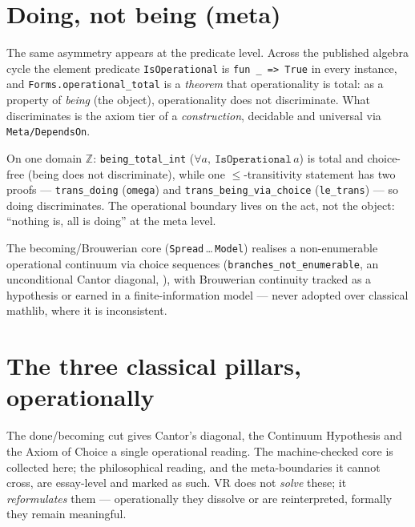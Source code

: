 \section{Doing, not being (meta)}
\label{sec:continuum_doing}

The same asymmetry appears at the predicate level.  Across the published algebra cycle
the element predicate \texttt{IsOperational} is \texttt{fun \_ => True} in every
instance, and \texttt{Forms.operational\_total} is a \emph{theorem} that operationality
is total: as a property of \emph{being} (the object), operationality does not
discriminate.  What discriminates is the axiom tier of a \emph{construction}, decidable
and universal via \texttt{Meta/DependsOn}.

\begin{theorem}
\label{thm:continuum_doingbeing}
\leanok
On one domain $\mathbb{Z}$: \texttt{being\_total\_int} ($\forall a,\ \texttt{IsOperational}\,a$)
is total and choice-free (being does not discriminate), while one $\le$-transitivity
statement has two proofs --- \texttt{trans\_doing} (\texttt{omega})
 and \texttt{trans\_being\_via\_choice}
(\texttt{le\_trans})  --- so doing
discriminates.  The operational boundary lives on the act, not the object: ``nothing
is, all is doing'' at the meta level.
\end{theorem}

The becoming/Brouwerian core (\texttt{Spread}\,\dots\,\texttt{Model}) realises a
non-enumerable operational continuum via choice sequences
(\texttt{branches\_not\_enumerable}, an unconditional Cantor diagonal,
\axiomprofile{[]}), with Brouwerian continuity tracked as a hypothesis or earned
in a finite-information model --- never adopted over classical mathlib, where it is
inconsistent.

\section{The three classical pillars, operationally}
\label{sec:continuum_pillars}

The done/becoming cut gives Cantor's diagonal, the Continuum Hypothesis and the Axiom of
Choice a single operational reading.  The machine-checked core is collected here; the
philosophical reading, and the meta-boundaries it cannot cross, are essay-level and marked as
such.  VR does not \emph{solve} these; it \emph{reformulates} them --- operationally they
dissolve or are reinterpreted, formally they remain meaningful.

